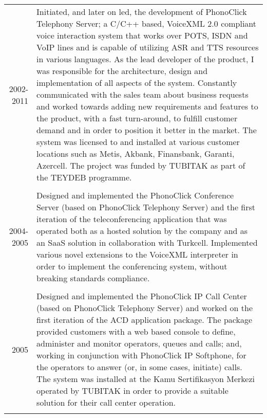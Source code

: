 \documentclass[a4paper,10pt]{article}
\begin{document}
\begin{longtable}{r|p{11cm}}
  \textsc{2002-2011}            & Initiated, and later on led, the development of PhonoClick Telephony Server; a C/C++ based, VoiceXML 2.0 compliant voice interaction system that works over POTS, ISDN and VoIP lines and is capable of utilizing ASR
                                and TTS resources in various languages. As the lead developer of the product, I was responsible for the architecture, design and implementation of all aspects of the system. Constantly communicated with the sales team about business requests and worked towards adding new requirements and features to the product, with a fast turn-around, to fulfill customer demand and in order to position it better in the market. The system was licensed to and installed at various customer locations such as Metis, Akbank, Finansbank, Garanti, Azercell. The project was funded by TUBITAK as part of the TEYDEB programme. \\
  \multicolumn{2}{c}{} \\

  \textsc{2004-2005}            & Designed and implemented the PhonoClick Conference Server (based on PhonoClick Telephony Server) and the first iteration of the teleconferencing application that was operated both as a hosted solution by the company and as an SaaS solution in collaboration with Turkcell. Implemented various novel extensions to the VoiceXML interpreter in order to implement the conferencing system, without breaking standards compliance. \\
  \multicolumn{2}{c}{} \\


  \textsc{2005}                 & Designed and implemented the PhonoClick IP Call Center (based on PhonoClick Telephony Server) and worked on the first iteration of the ACD application package. The package provided customers with a web based console to define, administer and monitor operators, queues and calls; and, working in conjunction with PhonoClick IP Softphone, for the operators to answer (or, in some cases, initiate) calls. The system was installed at the Kamu Sertifikasyon Merkezi operated by TUBITAK in order to provide a suitable solution for their call center operation. \\
  \multicolumn{2}{c}{} \\



\end{longtable}
\end{document}
